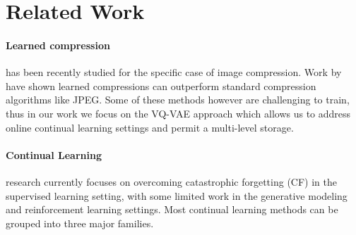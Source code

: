 \documentclass[colorinlistoftodos]{article} %
\begin{document}
				

 



\section{Related Work}

\paragraph{Learned compression} has been recently studied for the specific case of image compression. Work by \citet{theis2017lossy,balle2016end,johnston2018improved} have shown learned compressions can outperform standard compression algorithms like JPEG. Some of these methods however are challenging to train, thus in our work we focus on the VQ-VAE approach \cite{van2017neural,razavi2019generating} which allows us to address online continual learning settings and permit a multi-level storage. 

\paragraph{Continual Learning} research currently focuses on overcoming catastrophic forgetting (CF) in the supervised learning setting, with some limited work in the generative modeling and reinforcement learning settings. Most continual learning methods can be grouped into three major families. 
\end{document}
